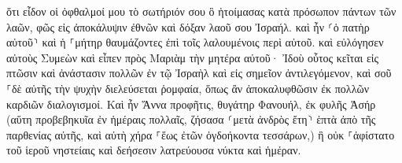 \documentclass{openreader}
\begin{document}
ὅτι εἶδον οἱ ὀφθαλμοί μου τὸ σωτήριόν σου 
ὃ ἡτοίμασας κατὰ πρόσωπον πάντων τῶν λαῶν, 
φῶς εἰς ἀποκάλυψιν ἐθνῶν καὶ δόξαν λαοῦ σου Ἰσραήλ. 
καὶ ἦν ⸂ὁ πατὴρ αὐτοῦ⸃ καὶ ἡ ⸀μήτηρ θαυμάζοντες ἐπὶ τοῖς λαλουμένοις περὶ αὐτοῦ. 
καὶ εὐλόγησεν αὐτοὺς Συμεὼν καὶ εἶπεν πρὸς Μαριὰμ τὴν μητέρα αὐτοῦ· Ἰδοὺ οὗτος κεῖται εἰς πτῶσιν καὶ ἀνάστασιν πολλῶν ἐν τῷ Ἰσραὴλ καὶ εἰς σημεῖον ἀντιλεγόμενον, 
καὶ σοῦ ⸀δὲ αὐτῆς τὴν ψυχὴν διελεύσεται ῥομφαία, ὅπως ἂν ἀποκαλυφθῶσιν ἐκ πολλῶν καρδιῶν διαλογισμοί. 
Καὶ ἦν Ἅννα προφῆτις, θυγάτηρ Φανουήλ, ἐκ φυλῆς Ἀσήρ (αὕτη προβεβηκυῖα ἐν ἡμέραις πολλαῖς, ζήσασα ⸂μετὰ ἀνδρὸς ἔτη⸃ ἑπτὰ ἀπὸ τῆς παρθενίας αὐτῆς, 
καὶ αὐτὴ χήρα ⸀ἕως ἐτῶν ὀγδοήκοντα τεσσάρων,) ἣ οὐκ ⸀ἀφίστατο τοῦ ἱεροῦ νηστείαις καὶ δεήσεσιν λατρεύουσα νύκτα καὶ ἡμέραν. 
\end{document}
